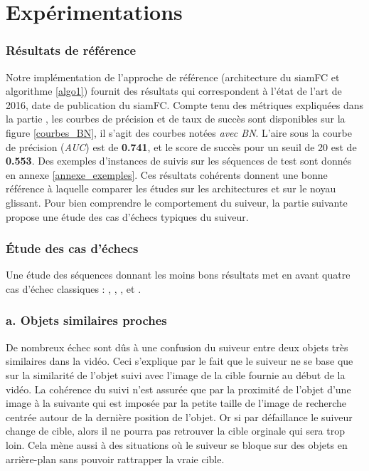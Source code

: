 \documentclass[10pt,twocolumn,letterpaper,french]{article}
\begin{document}
\section*{Expérimentations}

\subsubsection*{Résultats de référence}

Notre implémentation de l'approche de référence (architecture du siamFC \cite{siamfc} et algorithme \ref{algo1}) fournit des résultats qui correspondent à l'état de l'art de 2016, date de publication du siamFC. Compte tenu des métriques expliquées dans la partie \textit{}, les courbes de précision et de taux de succès sont disponibles sur la figure \ref{courbes_BN}, il s'agit des courbes notées \textit{avec BN}. L'aire sous la courbe de précision (\textit{AUC}) est de \textbf{0.741}, et le score de succès pour un seuil de 20 est de \textbf{0.553}. Des exemples d'instances de suivis sur les séquences de test sont donnés en annexe \ref{annexe_exemples}. Ces résultats cohérents donnent une bonne référence à laquelle comparer les études sur les architectures et sur le noyau glissant. Pour bien comprendre le comportement du suiveur, la partie suivante propose une étude des cas d'échecs typiques du suiveur.

\subsubsection*{Étude des cas d'échecs}
\label{echecs}

Une étude des séquences donnant les moins bons résultats met en avant quatre cas d'échec classiques : \textit{}, \textit{}, \textit{}, et \textit{}.


\subsubsection*{a. Objets similaires proches}
\label{proches}

De nombreux échec sont dûs à une confusion du suiveur entre deux objets très similaires dans la vidéo. Ceci s'explique par le fait que le suiveur ne se base que sur la similarité de l'objet suivi avec l'image de la cible fournie au début de la vidéo. La cohérence du suivi n'est assurée que par la proximité de l'objet d'une image à la suivante qui est imposée par la petite taille de l'image de recherche centrée autour de la dernière position de l'objet. Or si par défaillance le suiveur change de cible, alors il ne pourra pas retrouver la cible orginale qui sera trop loin. Cela mène aussi à des situations où le suiveur se bloque sur des objets en arrière-plan sans pouvoir rattrapper la vraie cible.
\end{document}

